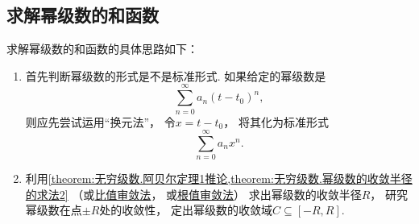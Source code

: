 \subsection*{求解幂级数的和函数}
求解幂级数的和函数的具体思路如下：
\begin{enumerate}
	\item 首先判断幂级数的形式是不是标准形式.
	如果给定的幂级数是\begin{equation*}
		\sum_{n=0}^\infty a_n (t-t_0)^n,
	\end{equation*}
	则应先尝试运用“换元法”，
	令\(x=t-t_0\)，
	将其化为标准形式\begin{equation*}
		\sum_{n=0}^\infty a_n x^n.
	\end{equation*}

	\item 利用\cref{theorem:无穷级数.阿贝尔定理1推论,theorem:无穷级数.幂级数的收敛半径的求法2}%
	（或\hyperref[theorem:无穷级数.正项级数的比值审敛法]{比值审敛法}，
	或\hyperref[theorem:无穷级数.正项级数的根值审敛法]{根值审敛法}）%
	求出幂级数的收敛半径\(R\)，
	研究幂级数在点\(\pm R\)处的收敛性，
	定出幂级数的收敛域\(C\subseteq[-R,R]\).


\end{enumerate}
